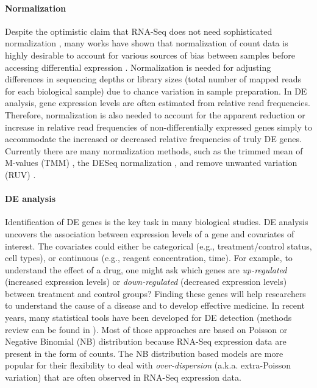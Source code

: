 \paragraph*{Normalization}
Despite the optimistic claim that RNA-Seq does not need sophisticated normalization
\citep{wang2009rna}, many works have shown that normalization of count data is highly desirable
 to account for various sources of bias between samples before accessing differential expression
\citep{anders2010differential, dillies2013comprehensive,hansen2012removing, risso2014nat,
	risso2011gc,robinson2010scaling}. Normalization is needed for adjusting differences in sequencing
depths or library sizes (total number of mapped reads for each biological sample) due to chance
variation in sample preparation. In DE analysis, gene expression levels are often estimated from
relative read frequencies. Therefore, normalization is also needed to account for the apparent
reduction or increase in relative read frequencies of non-differentially expressed genes simply to
accommodate the increased or decreased relative frequencies of truly DE genes. Currently there are
many normalization methods, such as the trimmed mean of M-values (TMM) \citep{robinson2010scaling},
the DESeq normalization \citep{anders2010differential}, and remove unwanted variation (RUV)
\citep{risso2014nat}. 

\paragraph*{DE analysis}
Identification of DE genes is the key task in many biological studies. DE analysis uncovers the
association between expression levels of a gene and covariates of interest. The covariates could either be
categorical (e.g., treatment/control status, cell types), or continuous (e.g., reagent
concentration, time). For example, to understand the effect of a drug, one might ask which genes are
\textit{up-regulated} (increased expression levels) or \textit{down-regulated} (decreased expression levels)
between treatment and control groups? Finding these genes will help researchers to understand the
cause of a disease and to develop effective medicine. In recent years, many statistical tools have been
developed for DE detection (methods review can be found in \cite{rapaport2013comprehensive,seyednasrollah2015comparison,
	soneson2013comparison}). 
Most of those approaches are based on Poisson \citep{marioni2008rna, wang2010degseq}
or Negative Binomial (NB) distribution
\citep{anders2010differential,di2011nbp,oberg2012technical,robinson2007moderated, wu2013new} because
RNA-Seq expression data are present in the form of counts. %
The NB distribution based models are more popular for their flexibility to deal with 
\textit{over-dispersion} (a.k.a. extra-Poisson variation) that are often observed in RNA-Seq expression data.


